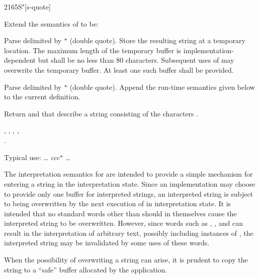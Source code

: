 \begin{worddef}[Sq]{2165}{S"}[s-quote]
\item Extend the semantics of  to be:

\interpret

	Parse  delimited by \texttt{"} (double quote). Store
	the resulting string  at a temporary location.
	The maximum length of the temporary buffer is
	implementation-dependent but shall be no less than 80 characters.
	Subsequent uses of  may overwrite the temporary buffer.
	At least one such buffer shall be provided.

\compile

	Parse  delimited by \texttt{"} (double quote). Append
	the run-time semantics given below to the current definition.

\runtime

	Return  and  that describe a string
	consisting of the characters .

\see {},
	,
	,
	, \\
	.

	\begin{rationale} %
		Typical use:
			{\ldots}  \emph{ccc}\texttt{"} {\ldots}

		The interpretation semantics for  are intended to
		provide a simple mechanism for entering a string in the
		interpretation state. Since an implementation may choose to
		provide only one buffer for interpreted strings, an
		interpreted string is subject to being overwritten by the
		next execution of  in interpretation state. It is
		intended that no standard words other than  should
		in themselves cause the interpreted string to be overwritten.
		However, since words such as ,
		,  and
		 can result in the interpretation of arbitrary
		text, possibly including instances of , the
		interpreted string may be invalidated by some uses of these
		words.

		When the possibility of overwriting a string can arise, it is
		prudent to copy the string to a ``safe'' buffer allocated by
		the application.
	\end{rationale}

	\begin{testing}
		 \tab {} 
	\end{testing}
\end{worddef}


